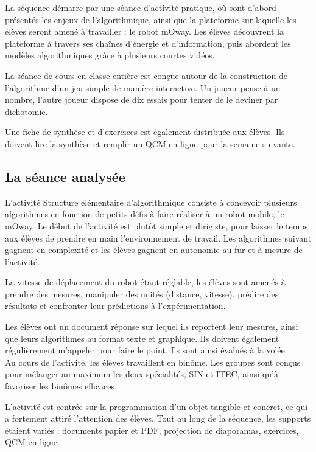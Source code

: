 \documentclass[pdftex,a4paper,12pt]{article}
\begin{document}
	La séquence démarre par une séance d’activité pratique, où sont d'abord présentés les enjeux de l'algorithmique, ainsi que la plateforme sur 
	laquelle les élèves seront amené à travailler : le robot mOway.
	Les élèves découvrent la plateforme à travers ses chaînes d'énergie et d'information, 
	puis abordent les modèles algorithmiques grâce à plusieurs courtes vidéos.

	La séance de cours en classe entière est conçue autour de la construction de l'algorithme d'un jeu simple de manière interactive.
	Un joueur pense à un nombre, l'autre joueur dispose de dix essais pour tenter de le deviner par dichotomie.

	Une fiche de synthèse et d’exercices est également distribuée aux élèves. Ils doivent lire la synthèse 
	et remplir un QCM en ligne pour la semaine suivante.

	\subsection{La séance analysée}
	L'activité \og{} Structure élémentaire d’algorithmique \fg{} consiste à concevoir plusieurs algorithmes 
	en fonction de petits défis à faire réaliser à un robot mobile, le mOway. 
	Le début de l'activité est plutôt simple et dirigiste, pour laisser le temps aux élèves de prendre en main l'environnement de travail. 
	Les algorithmes suivant gagnent en complexité et les élèves gagnent en autonomie au fur et à mesure de l'activité.

	La vitesse de déplacement du robot étant réglable, les élèves sont amenés à prendre des mesures, 
	manipuler des unités (distance, vitesse), prédire des résultats et confronter leur prédictions à l'expérimentation.

	Les élèves ont un document réponse sur lequel ils reportent leur mesures, ainsi que leurs algorithmes au format texte et graphique. 
	Ils doivent également régulièrement m’appeler pour faire le point. 
	Ils sont ainsi évalués à la volée.\\

	Au cours de l'activité, les élèves travaillent en binôme. 
	Les groupes sont conçus pour mélanger au maximum les deux spécialités, SIN et ITEC, ainsi qu'à favoriser les binômes efficaces.

	L'activité est centrée sur la programmation d'un objet tangible et concret, ce qui a fortement attiré l'attention des élèves.
	Tout au long de la séquence, les supports étaient variés : documents papier et PDF, projection de diaporamas, exercices, QCM en ligne.
\end{document}
